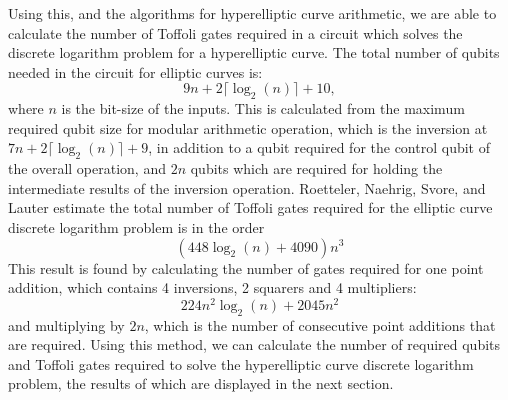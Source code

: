 Using this, and the algorithms for hyperelliptic curve arithmetic, we are able to calculate the number of Toffoli gates required in a circuit which solves the discrete logarithm problem for a hyperelliptic curve. The total number of qubits needed in the circuit for elliptic curves is: 
$$9n+2\lceil\log_2(n)\rceil + 10,$$ where $n$ is the bit-size of the inputs. This is calculated from the maximum required qubit size for modular arithmetic operation, which is the inversion at $7n+2\lceil\log_2(n)\rceil + 9$, in addition to a qubit required for the control qubit of the overall operation, and $2n$ qubits which are required for holding the intermediate results of the inversion operation. Roetteler, Naehrig, Svore, and Lauter estimate the total number of Toffoli gates required for the elliptic curve discrete logarithm problem is in the order 
$$(448\log_2(n)+4090)n^3$$
This result is found by calculating the number of gates required for one point addition, which contains 4 inversions, 2 squarers and 4 multipliers:
$$224n^2\log_2(n) + 2045n^2$$
and multiplying by $2n$, which is the number of consecutive point additions that are required.
Using this method, we can calculate the number of required qubits and Toffoli gates required to solve the hyperelliptic curve discrete logarithm problem, the results of which are displayed in the next section.